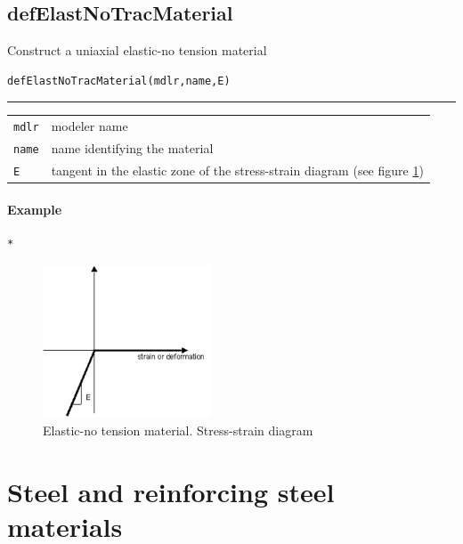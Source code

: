 \subsection{defElastNoTracMaterial}
\noindent Construct a uniaxial elastic-no tension material
\begin{verbatim}
defElastNoTracMaterial(mdlr,name,E)
\end{verbatim}
\vspace{-10pt}
{\color{grayLines} \rule{\linewidth}{0.25pt}}
\begin{center}
\begin{tabular}{lp{10cm}}
{\tt mdlr} & modeler name \\
{\tt name} & name identifying the material \\
{\tt E} & tangent in the elastic zone of the stress-strain diagram (see figure \ref{ENT}) \\
\end{tabular}
\end{center}
\paragraph{Example}
\begin{verbatim}
*
\end{verbatim}
\begin{figure}[h]
\centering
\includegraphics[width=50mm]{materials/figures/ENT}
\caption{Elastic-no tension material. Stress-strain diagram}\label{ENT}
\end{figure}

\section{Steel and reinforcing steel materials}
